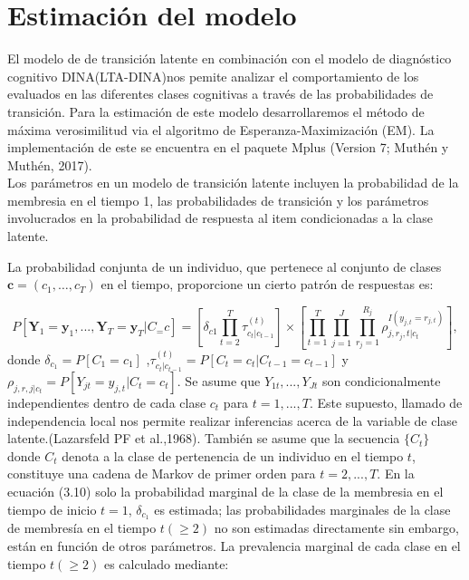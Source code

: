 	\section{Estimaci\'{o}n del modelo}	
El modelo de de transición latente en combinación con el modelo de diagnóstico cognitivo DINA(LTA-DINA)nos pemite analizar el comportamiento de los evaluados en las diferentes clases cognitivas a través de las probabilidades de transición. Para la estimación de este modelo desarrollaremos el método de máxima verosimilitud via el algoritmo de Esperanza-Maximización (EM). La implementación de este se encuentra en el paquete Mplus (Version 7; Muthén y Muthén, 2017).\\     
	Los par\'{a}metros en un modelo de transici\'{o}n latente incluyen la probabilidad de la membresia en el tiempo 1, las probabilidades de transici\'{o}n y los parámetros involucrados en la probabilidad de respuesta al item condicionadas a la clase latente.\
	
	La probabilidad conjunta de un individuo, que pertenece al conjunto de clases $\mathbf{c}=\left(c_{1}, \dots, c_{T}\right)$ en el tiempo, proporcione un cierto patrón de respuestas es:
	
	\begin{equation}
		P\left[\mathbf{ Y }_{ 1 }=\mathbf{ y }_{1},...,\mathbf{Y}_{ T }=\mathbf{ y }_{T}| {C}_={c} \right] =\left[ { \delta  }_{ c1 }\prod _{ t=2 }^{ T }{ { \tau  }_{ { c }_{ t }|{ c }_{ t-1 } }^{ (t) } }  \right] \times \left[ \prod _{ t=1 }^{ T }{ \prod _{ j=1 }^{ J }{ \prod _{ r_{j}=1 }^{ { R }_{ j } }{ { \rho  }_{ j,r_{j},t|{ c }_{ t } }^{ I({ y }_{ j,t }=r_{j,t}) } }  }  }  \right], \label{3.11}	
	\end{equation}	
donde ${ \delta  }_{ { c }_{ 1 } }=P\left[ { C }_{ 1 }={ c }_{ 1 } \right]$ ,${ \tau  }_{ { c }_{ t }|{c}_{ t-1 } }^{ (t) }=P\left[ { C }_{ t }={ c }_{ t }|{C}_{ t-1 }={ c }_{ t-1 } \right]$ y ${ \rho  }_{ j,r,j|{ c }_{ t } }=P\left[ { Y }_{ jt }=y_{j,t}|{ C }_{ t }={ c }_{ t } \right]$. Se asume que ${ Y }_{ 1t },...,{ Y }_{ Jt }$ son condicionalmente independientes dentro de cada clase ${ c }_{ t }$ para $t=1,...,T$. Este supuesto, llamado de independencia local nos permite realizar inferencias acerca de la variable de clase latente.(Lazarsfeld PF et al.,1968). Tambi\'{e}n se asume que la secuencia $\{ C_{t} \}$ donde ${C}_{t}$ denota a la clase de pertenencia de un individuo en el tiempo $t$, constituye una cadena de Markov de primer orden para $t=2,...,T$. En la ecuaci\'{o}n (3.10) solo la probabilidad marginal de la clase de la membresia en el tiempo de inicio $t=1$, ${ \delta  }_{ { c }_{ 1 } }$ es estimada; las probabilidades marginales de la clase de membres\'{i}a en el tiempo $t(\geqslant 2)$ no son estimadas directamente sin embargo, est\'{a}n en funci\'{o}n de otros par\'{a}metros. La prevalencia marginal de cada clase en el tiempo $t(\geqslant 2)$ es calculado mediante: 
	
